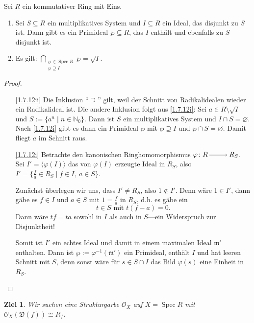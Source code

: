 \documentclass[a4paper,12pt,index=toc]{scrbook}
\theoremstyle{keinenummern} %
\newtheorem{ziel}{Ziel}
\def\O{\mathcal{O}}
\newcommand{\D}{\mathfrak{D}}
\def\m{\mathfrak{m}}
\newcommand{\Spec}{\operatorname{Spec}}
\renewcommand{\phi}{\varphi}
\newcommand{\leer}{\ensuremath{\varnothing}}
\newcommand{\set}[1]{\ensuremath{\mathbb{#1}}}
\newcommand{\N}{\set{N}}
\begin{document}
\begin{lem}\label{1.7.12}
  Sei $R$ ein kommutativer Ring mit Eins.
  \begin{enumerate}
  \item{} Sei $S\subseteq R$ ein multiplikatives System und $I\subseteq R$ ein Ideal, das disjunkt zu $S$ ist. Dann
    gibt es ein Primideal $\wp\subseteq R$, das $I$ enthält und ebenfalls zu $S$ disjunkt ist.
  \item{} Es gilt: $\displaystyle\!\!\!\bigcap_{\substack{\wp\in\Spec R\\\wp\supseteq I}}\!\!\!\wp = \sqrt{I}$.
  \end{enumerate}
\end{lem}
\begin{proof}
  \begin{enumerate}
  \item[\ref{1.7.12ii}] Die Inklusion \enquote{$\supseteq$} gilt, weil der Schnitt von Radikalidealen wieder ein Radikalideal
    ist. Die andere Inklusion folgt aus \ref{1.7.12i}: Sei $a\in R\setminus\sqrt{I}$ und $S:=\{a^n\mid n\in\N_0\}$. Dann ist $S$
    ein multiplikatives System und $I\cap S=\leer$. Nach \ref{1.7.12i} gibt es dann ein Primideal $\wp$ mit $\wp\supseteq I$ und
    $\wp\cap S=\leer$. Damit fliegt $a$ im Schnitt raus.
  \item[\ref{1.7.12i}] Betrachte den kanonischen Ringhomomorphismus $\phi\colon R\ra R_S$. Sei $I'=\langle\phi(I)\rangle$ das von $\phi(I)$
    erzeugte Ideal in $R_S$, also $I'=\{\frac{f}{a}\in R_S\mid f\in I,\ a\in S\}$.

    Zunächst überlegen wir uns, dass $I'\neq R_S$, also $1\notin I'$. Denn wäre $1\in I'$, dann gäbe es $f\in I$ und $a\in S$
    mit $1=\frac{f}{a}$ in $R_S$, d.h. es gäbe ein
    \[t\in S\text{ mit }t(f-a)=0.\] 
    Dann wäre $tf=ta$ sowohl in $I$ als auch in $S$---ein Widerspruch zur Disjunktheit!

    Somit ist $I'$ ein echtes Ideal und damit in einem maximalen Ideal $\m'$ enthalten. Dann ist $\wp:=\phi^{-1}(\m')$ ein
    Primideal, enthält $I$ und hat leeren Schnitt mit $S$, denn sonst wäre für $s\in S\cap I$ das Bild $\phi(s)$ eine Einheit in
    $R_S$.
  \end{enumerate}
\end{proof}

\begin{ziel}
  Wir suchen eine Strukturgarbe $\O_X$ auf $X=\Spec R$ mit $\O_X(\D(f))\cong R_f$.
\end{ziel}
\end{document}
